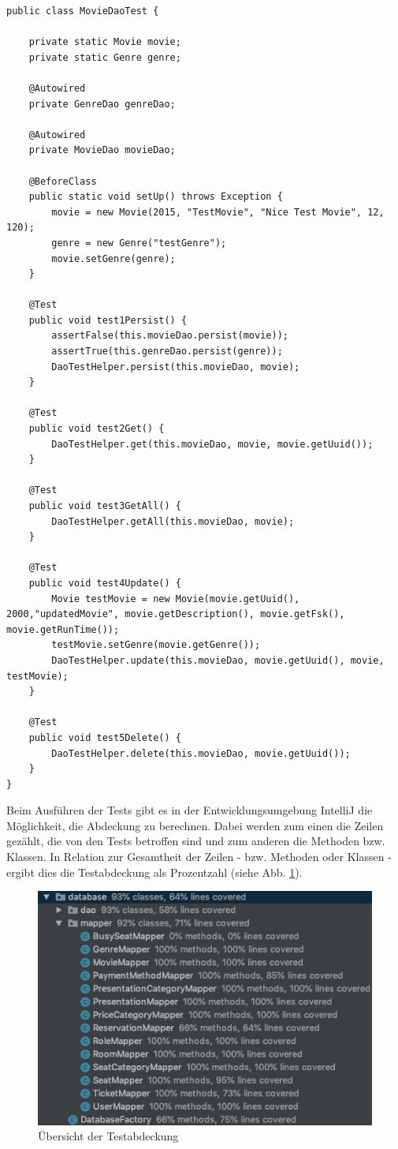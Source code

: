 	\begin{lstlisting}
public class MovieDaoTest {

	private static Movie movie;
	private static Genre genre;
	
	@Autowired
	private GenreDao genreDao;
	
	@Autowired
	private MovieDao movieDao;
	
	@BeforeClass
	public static void setUp() throws Exception {
		movie = new Movie(2015, "TestMovie", "Nice Test Movie", 12, 120);
		genre = new Genre("testGenre");
		movie.setGenre(genre);
	}
	
	@Test
	public void test1Persist() {
		assertFalse(this.movieDao.persist(movie));
		assertTrue(this.genreDao.persist(genre));
		DaoTestHelper.persist(this.movieDao, movie);
	}
	
	@Test
	public void test2Get() {
		DaoTestHelper.get(this.movieDao, movie, movie.getUuid());
	}
	
	@Test
	public void test3GetAll() {
		DaoTestHelper.getAll(this.movieDao, movie);
	}
	
	@Test
	public void test4Update() {
		Movie testMovie = new Movie(movie.getUuid(), 2000,"updatedMovie", movie.getDescription(), movie.getFsk(), movie.getRunTime());
		testMovie.setGenre(movie.getGenre());
		DaoTestHelper.update(this.movieDao, movie.getUuid(), movie, testMovie);
	}
	
	@Test
	public void test5Delete() {
		DaoTestHelper.delete(this.movieDao, movie.getUuid());
	}
}
	\end{lstlisting}
	Beim Ausführen der Tests gibt es in der Entwicklungsumgebung IntelliJ die Möglichkeit, die Abdeckung zu berechnen. Dabei werden zum einen die Zeilen gezählt, die von den Tests betroffen sind und zum anderen die Methoden bzw. Klassen. In Relation zur Gesamtheit der Zeilen - bzw. Methoden oder Klassen - ergibt dies die Testabdeckung als Prozentzahl (siehe Abb. \ref{fig:TestCoverage}).\newline
	\begin{figure} 
		\centering 
		\includegraphics[scale=0.6]{img/testCoverage.png}
		\captionsetup{format=hang}
		\centering\caption[Testabdeckung]{\label{fig:TestCoverage} Übersicht der Testabdeckung}
	\end{figure}
